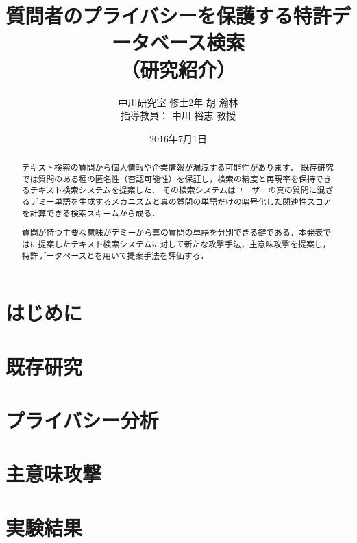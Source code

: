 \documentclass{jsarticle}
\title{質問者のプライバシーを保護する特許データベース検索 \\（研究紹介）}
\author{中川研究室 修士2年 胡 瀚林\\指導教員： 中川 裕志 教授}
\date{2016年7月1日}
\theoremstyle{definition}
\begin{document}
\maketitle
\begin{abstract}
テキスト検索の質問から個人情報や企業情報が漏洩する可能性があります．
既存研究\cite{pang_embellishing_2010}では質問のある種の匿名性（否認可能性）を保証し，検索の精度と再現率を保持できるテキスト検索システムを提案した．
その検索システムはユーザーの真の質問に混ざるデミー単語を生成するメカニズムと真の質問の単語だけの暗号化した関連性スコアを計算できる検索スキームから成る．

質問が持つ主要な意味がデミーから真の質問の単語を分別できる鍵である．本発表では\cite{pang_embellishing_2010}に提案したテキスト検索システムに対して新たな攻撃手法，主意味攻撃を提案し，特許データベースとを用いて提案手法を評価する．
\end{abstract}

\section{はじめに}
\section{既存研究}
\section{プライバシー分析}
\section{主意味攻撃}
\section{実験結果}


\end{document}
